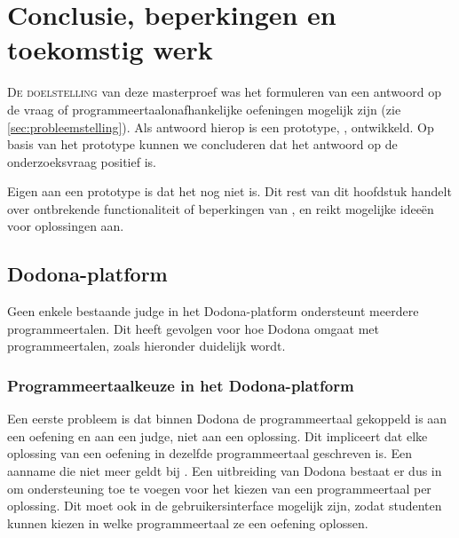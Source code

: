 \chapter{Conclusie, beperkingen en toekomstig werk}\label{ch:beperkingen-en-toekomstig-werk}

\lettrine{D}{e doelstelling} van deze masterproef was het formuleren van een antwoord op de vraag of programmeertaalonafhankelijke oefeningen mogelijk zijn (zie \cref{sec:probleemstelling}).
Als antwoord hierop is een prototype, \tested{}, ontwikkeld.
Op basis van het prototype kunnen we concluderen dat het antwoord op de onderzoeksvraag positief is.

Eigen aan een prototype is dat het nog niet  is.
Dit rest van dit hoofdstuk handelt over ontbrekende functionaliteit of beperkingen van \tested{}, en reikt mogelijke ideeën voor oplossingen aan.

\section{Dodona-platform}\label{sec:dodona-platform}

Geen enkele bestaande judge in het Dodona-platform ondersteunt meerdere programmeertalen.
Dit heeft gevolgen voor hoe Dodona omgaat met programmeertalen, zoals hieronder duidelijk wordt.

\subsection{Programmeertaalkeuze in het Dodona-platform}\label{subsec:programmeertaalkeuze-in-het-dodona-platform}

Een eerste probleem is dat binnen Dodona de programmeertaal gekoppeld is aan een oefening en aan een judge, niet aan een oplossing.
Dit impliceert dat elke oplossing van een oefening in dezelfde programmeertaal geschreven is.
Een aanname die niet meer geldt bij \tested{}.
Een uitbreiding van Dodona bestaat er dus in om ondersteuning toe te voegen voor het kiezen van een programmeertaal per oplossing.
Dit moet ook in de gebruikersinterface mogelijk zijn, zodat studenten kunnen kiezen in welke programmeertaal ze een oefening oplossen.

